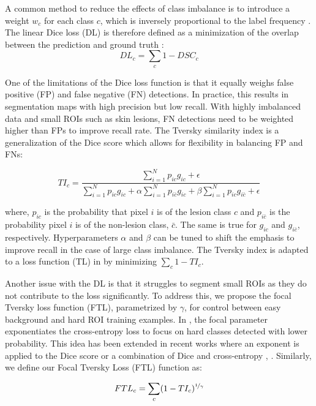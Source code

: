 \documentclass{article}
\begin{document}
A common method to reduce the effects of class imbalance is to introduce a weight $w_c$ for each class $c$, which is inversely proportional to the label frequency \cite{wong}.  The linear Dice loss (DL) is therefore defined as a minimization of the overlap between the prediction and ground truth \cite{milletari}: 
\begin{equation}
  DL_c = \sum_{c} 1 - DSC_c
\label{eq:DL} 
\end{equation}

One of the limitations of the Dice loss function is that it equally weighs false positive (FP) and false negative (FN) detections. In practice, this results in segmentation maps with high precision but low recall. With highly imbalanced data and small ROIs such as skin lesions, FN detections need to be weighted higher than FPs to improve recall rate. The Tversky similarity index is a generalization of the Dice score which allows for flexibility in balancing FP and FNs:

\begin{equation}
  TI_c = \frac{\sum_{i=1} ^N p_{ic} g_{ic} + \epsilon}{\sum_{i=1} ^N p_{ic}g_{ic} + \alpha\sum_{i=1} ^N p_{i\bar{c}}g_{ic} + \beta\sum_{i=1} ^N p_{ic}g_{i\bar{c}} + \epsilon} 
\label{eq:tversky} 
\end{equation}

where, $p_{ic}$ is the probability that pixel $i$ is of the lesion class $c$ and $p_{i\bar{c}}$ is the probability pixel $i$ is of the non-lesion class, $\bar{c}$. The same is true for $g_{ic}$ and $g_{i\bar{c}}$, respectively. Hyperparameters $\alpha$ and $\beta$ can be tuned to shift the emphasis to improve recall in the case of large class imbalance. The Tversky index is adapted to a loss function (TL) in \cite{tversky} by minimizing  $\sum_{c} 1 - TI_c$. 

Another issue with the DL is that it struggles to segment small ROIs as they do not contribute to the loss significantly. To address this, we propose the focal Tversky loss function (FTL), parametrized by $\gamma$, for control between easy background and hard ROI training examples. In \cite{focalloss}, the focal parameter exponentiates the cross-entropy loss to focus on hard classes detected with lower probability. This idea has been extended in recent works where an exponent is applied to the Dice score \cite{wang} or a combination of Dice and cross-entropy \cite{wong}, \cite{zhu}. Similarly, we define our Focal Tversky Loss (FTL) function as:
 
\begin{equation}
  FTL_c =  \sum_{c} (1 - TI_c)^{\nicefrac{1}{\gamma}}
\label{eq:FTL} 
\end{equation}
\end{document}
